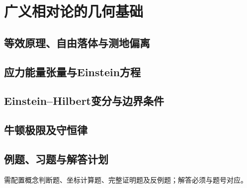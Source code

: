 \chapter{广义相对论的几何基础}
\label{ch:22-einstein}

\section{等效原理、自由落体与测地偏离}
\PlannedSection

\section{应力能量张量与Einstein方程}
\PlannedSection

\section{Einstein--Hilbert变分与边界条件}
\PlannedSection

\section{牛顿极限及守恒律}
\PlannedSection

\section{例题、习题与解答计划}
需配置概念判断题、坐标计算题、完整证明题及反例题；解答必须与题号对应。
